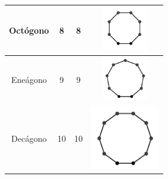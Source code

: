 \begin{table}[H]
\begin{tabular}{|c|c|c|c|}
 Octógono & 8 & 8 & \includegraphics[width=2cm]{./cap_geometria/figs/pol8} \\ \hline
 Eneágono & 9 & 9 & \includegraphics[width=2cm]{./cap_geometria/figs/pol9} \\ \hline
 Decágono & 10 & 10 & \includegraphics[width=3cm]{./cap_geometria/figs/pol10} \\ \hline
 \end{tabular}
\end{table}

